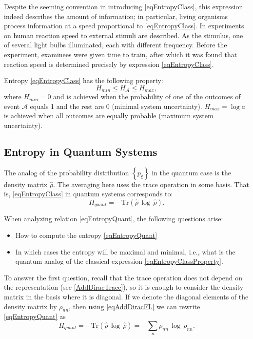 Despite the seeming convention in introducing \eqref{eqEntropyClass}, this
expression indeed describes the amount of information; in particular,
living organisms process information at a speed proportional to \eqref{eqEntropyClass}. In \cite{bYaglom}
experiments on human reaction speed
to external stimuli are described. As the stimulus, one of several
light bulbs illuminated, each with different frequency. Before
the experiment, examinees were given time to train, after which
it was found that reaction speed is determined precisely by expression \eqref{eqEntropyClass}.

Entropy \eqref{eqEntropyClass} has the following property:
\begin{equation}
H_{min} \le H_{\mathcal{A}} \le H_{max},
\label{eqEntropyClassProperty}
\end{equation}
where $H_{min} = 0$ and is achieved when the probability of one
of the outcomes of event $\mathcal{A}$ equals 1 and the rest are 0 (minimal
system uncertainty). $H_{max} = \log a$ is achieved when all
outcomes are equally probable (maximum system uncertainty).

\subsection{Entropy in Quantum Systems}

The analog of the probability distribution $\left\{p_{\xi}\right\}$ in
the quantum case is the density matrix 
$\hat{\rho}$. The averaging here uses the trace operation in some
basis. That is, \eqref{eqEntropyClass} in quantum systems corresponds to:
\begin{equation}
H_{quant} = - \mathrm{Tr} \left(\hat{\rho} \, \log \, \hat{\rho}\right).
\label{eqEntropyQuant}
\end{equation}

When analyzing relation \eqref{eqEntropyQuant}, the following
questions arise:
\begin{itemize}
\item How to compute the entropy \eqref{eqEntropyQuant}
\item In which cases the entropy will be maximal and minimal,
  i.e., what is the quantum analog of the classical expression
  \ref{eqEntropyClassProperty}. 
\end{itemize}

To answer the first question, recall that the trace operation does not
depend on the representation (see \autoref{AddDiracTrace}), so it is
enough to consider the density matrix in the basis where it is diagonal. If we denote the diagonal elements of the density matrix by $\rho_{nn}$,
then using \eqref{eqAddDiracFL} we can rewrite \eqref{eqEntropyQuant} as
\begin{equation}
H_{quant} = - \mathrm{Tr} \left(\hat{\rho} \, \log \, \hat{\rho}\right) = 
- \sum_n \rho_{nn} \, \log \, \rho_{nn}.
\label{eqEntropyQuant1}
\end{equation}

